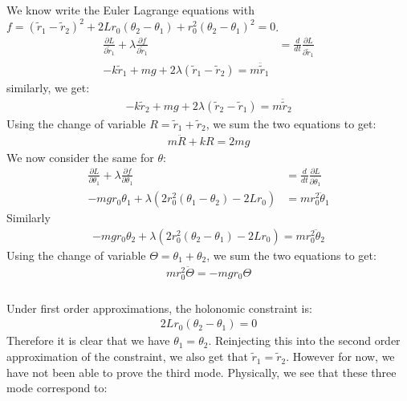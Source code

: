 \documentclass{article}
\begin{document}
We know write the Euler Lagrange equations with $f =  (\tilde{r}_1 -\tilde{r}_2)^2 + 2Lr_0(\theta_2 - \theta_1) + r_0^2(\theta_2 - \theta_1)^2 = 0$.
\begin{align*}
	\frac{\partial L}{\partial \tilde{r}_1} + \lambda\frac{\partial f}{\partial \tilde{r}_1} &= \frac{d}{dt}\frac{\partial L}{\partial \dot{\tilde{r}}_1}\\
	-k\tilde{r}_1 + mg + 2\lambda(\tilde{r}_1 - \tilde{r}_2) = m\ddot{\tilde{r}}_1
\end{align*}
similarly, we get:
\begin{align*}
	-k\tilde{r}_2 + mg + 2\lambda(\tilde{r}_2 - \tilde{r}_1) = m\ddot{\tilde{r}}_2
\end{align*}
Using the change of variable $R = \tilde{r}_1 + \tilde{r}_2$, we sum the two equations to get:
\begin{align*}
	m\ddot{R} + kR = 2mg
\end{align*}
We now consider the same for $\theta$:
\begin{align*}
	\frac{\partial L}{\partial \theta_1} + \lambda\frac{\partial f}{\partial \theta_1} &= \frac{d}{dt}\frac{\partial L}{\partial \dot{\theta}_1}\\
	-mgr_0\theta_1 + \lambda(2r_0^2(\theta_1 - \theta_2) - 2Lr_0) &= mr_0^2\ddot{\theta}_1
\end{align*}
Similarly
\begin{align*}
	-mgr_0\theta_2 + \lambda(2r_0^2(\theta_2 - \theta_1) - 2Lr_0) = mr_0^2\ddot{\theta}_2
\end{align*}
Using the change of variable $\Theta = \theta_1 + \theta_2$, we sum the two equations to get:
\begin{align*}
	mr_0^2\ddot{\Theta} = -mgr_0\Theta
\end{align*}
\subsubsection{} %

Under first order approximations, the holonomic constraint is:
\begin{align*}
	2Lr_0(\theta_2 - \theta_1) = 0
\end{align*}
Therefore it is clear that we have $\theta_1 = \theta_2$. Reinjecting this into the second order approximation of the constraint, we also get that $\tilde{r}_1 = \tilde{r}_2$. However for now, we have not been able to prove the third mode. Physically, we see that these three mode correspond to:
\end{document}
